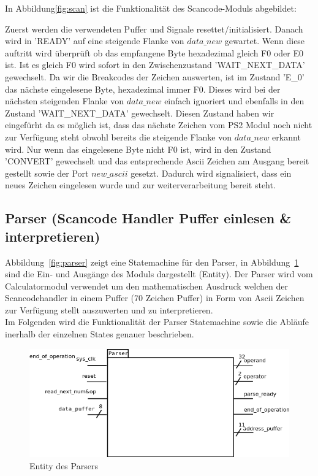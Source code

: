 In Abbildung\ref{fig:scan}  ist die Funktionalität des Scancode-Moduls abgebildet:

Zuerst werden die verwendeten Puffer und Signale resettet/initialisiert. Danach wird in 'READY' auf eine steigende Flanke von $data\_new$ gewartet. Wenn diese auftritt wird überprüft ob das empfangene Byte hexadezimal gleich F0 oder E0 ist. Ist es gleich F0 wird sofort in den Zwischenzustand 'WAIT\_NEXT\_DATA' gewechselt. Da wir die Breakcodes der Zeichen auswerten, ist im Zustand 'E\_0' das nächste eingelesene Byte, hexadezimal immer F0. Dieses wird bei der nächsten steigenden Flanke von $data\_new$ einfach ignoriert und ebenfalls in den Zustand 'WAIT\_NEXT\_DATA' gewechselt.
Diesen Zustand haben wir eingefürht da es möglich ist, dass das nächste Zeichen vom PS2 Modul noch nicht zur Verfügung steht obwohl bereits die steigende Flanke von $data\_new$ erkannt wird.
Nur wenn das eingelesene Byte nicht F0 ist, wird in den Zustand 'CONVERT' gewechselt und das entsprechende Ascii Zeichen am Ausgang bereit gestellt sowie der Port $new\_ascii$ gesetzt. Dadurch wird signalisiert, dass ein neues Zeichen eingelesen wurde und zur weiterverarbeitung bereit steht.  


\subsection{Parser (Scancode Handler Puffer einlesen \& interpretieren)}

Abbildung~\ref{fig:parser} zeigt eine Statemachine für den Parser, in Abbildung~\ref{fig:entity_parser} sind die Ein- und Ausgänge des Moduls dargestellt (Entity). Der Parser wird vom Calculatormodul verwendet um den mathematischen Ausdruck welchen der Scancodehandler in einem Puffer (70 Zeichen Puffer) in Form von Ascii Zeichen zur Verfügung stellt auszuwerten und zu interpretieren. \\
Im Folgenden wird die Funktionalität der Parser Statemachine sowie die Abläufe inerhalb der einzelnen States genauer beschrieben.

\begin{figure}[!ht]
	\centering
	\includegraphics[scale=0.5]{figures/entity_parser.png} 
	\caption{Entity des Parsers}
	\label{fig:entity_parser}
\end{figure}

